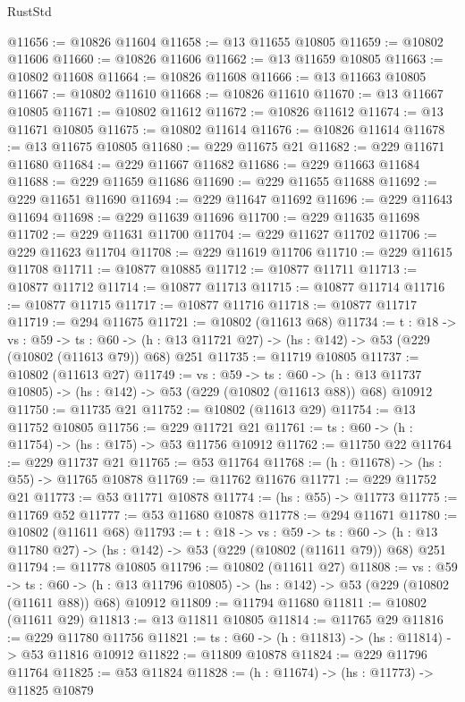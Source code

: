 \begin{lexlean}{RustStd}
\begin{coremodule}
@11656 := @10826 @11604
@11658 := @13 @11655 @10805
@11659 := @10802 @11606
@11660 := @10826 @11606
@11662 := @13 @11659 @10805
@11663 := @10802 @11608
@11664 := @10826 @11608
@11666 := @13 @11663 @10805
@11667 := @10802 @11610
@11668 := @10826 @11610
@11670 := @13 @11667 @10805
@11671 := @10802 @11612
@11672 := @10826 @11612
@11674 := @13 @11671 @10805
@11675 := @10802 @11614
@11676 := @10826 @11614
@11678 := @13 @11675 @10805
@11680 := @229 @11675 @21
@11682 := @229 @11671 @11680
@11684 := @229 @11667 @11682
@11686 := @229 @11663 @11684
@11688 := @229 @11659 @11686
@11690 := @229 @11655 @11688
@11692 := @229 @11651 @11690
@11694 := @229 @11647 @11692
@11696 := @229 @11643 @11694
@11698 := @229 @11639 @11696
@11700 := @229 @11635 @11698
@11702 := @229 @11631 @11700
@11704 := @229 @11627 @11702
@11706 := @229 @11623 @11704
@11708 := @229 @11619 @11706
@11710 := @229 @11615 @11708
@11711 := @10877 @10885
@11712 := @10877 @11711
@11713 := @10877 @11712
@11714 := @10877 @11713
@11715 := @10877 @11714
@11716 := @10877 @11715
@11717 := @10877 @11716
@11718 := @10877 @11717
@11719 := @294 @11675
@11721 := @10802 (@11613 @68)
@11734 := {t : @18} ->
  {vs : @59} ->
  {ts : @60} -> (h : @13 @11721 @27) -> (hs : @142) -> @53 (@229 (@10802 (@11613 @79)) @68) @251
@11735 := @11719 @10805
@11737 := @10802 (@11613 @27)
@11749 := {vs : @59} ->
  {ts : @60} ->
  (h : @13 @11737 @10805) -> (hs : @142) -> @53 (@229 (@10802 (@11613 @88)) @68) @10912
@11750 := @11735 @21
@11752 := @10802 (@11613 @29)
@11754 := @13 @11752 @10805
@11756 := @229 @11721 @21
@11761 := {ts : @60} -> (h : @11754) -> (hs : @175) -> @53 @11756 @10912
@11762 := @11750 @22
@11764 := @229 @11737 @21
@11765 := @53 @11764
@11768 := (h : @11678) -> (hs : @55) -> @11765 @10878
@11769 := @11762 @11676
@11771 := @229 @11752 @21
@11773 := @53 @11771 @10878
@11774 := (hs : @55) -> @11773
@11775 := @11769 @52
@11777 := @53 @11680 @10878
@11778 := @294 @11671
@11780 := @10802 (@11611 @68)
@11793 := {t : @18} ->
  {vs : @59} ->
  {ts : @60} -> (h : @13 @11780 @27) -> (hs : @142) -> @53 (@229 (@10802 (@11611 @79)) @68) @251
@11794 := @11778 @10805
@11796 := @10802 (@11611 @27)
@11808 := {vs : @59} ->
  {ts : @60} ->
  (h : @13 @11796 @10805) -> (hs : @142) -> @53 (@229 (@10802 (@11611 @88)) @68) @10912
@11809 := @11794 @11680
@11811 := @10802 (@11611 @29)
@11813 := @13 @11811 @10805
@11814 := @11765 @29
@11816 := @229 @11780 @11756
@11821 := {ts : @60} -> (h : @11813) -> (hs : @11814) -> @53 @11816 @10912
@11822 := @11809 @10878
@11824 := @229 @11796 @11764
@11825 := @53 @11824
@11828 := (h : @11674) -> (hs : @11773) -> @11825 @10879

\end{coremodule}
\end{lexlean}
